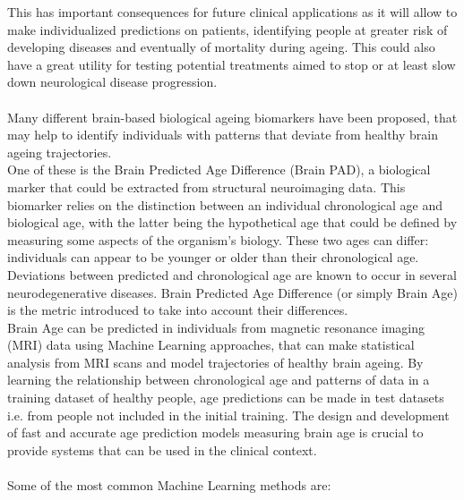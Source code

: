 \documentclass{article}
\begin{document}
	This has important consequences for future clinical applications as it will allow to make individualized predictions on patients, identifying people at greater risk of developing diseases and eventually of mortality during ageing. This could also have a great utility for testing potential treatments aimed to stop or at least slow down neurological disease progression.
	\\
	\\
	Many different brain-based biological ageing biomarkers have been proposed, that may help to identify individuals with patterns that deviate from healthy brain ageing trajectories.
	\\
	One of these is the Brain Predicted Age Difference (Brain PAD), a biological marker that could be extracted from structural neuroimaging data. This biomarker relies on the distinction between an individual chronological age and biological age, with the latter being the hypothetical age that could be defined by measuring some aspects of the organism's biology. These two ages can differ: individuals can appear to be younger or older than their chronological age. Deviations between predicted and chronological age are known to occur in several neurodegenerative diseases. Brain Predicted Age Difference (or simply Brain Age) is the metric introduced to take into account their differences.
	\\
	Brain Age can be predicted in individuals from magnetic resonance imaging (MRI) data using Machine Learning approaches, that can make statistical analysis from MRI scans and model trajectories of healthy brain ageing. By learning the relationship between chronological age and patterns of data in a training dataset of healthy people, age predictions can be made in test datasets i.e. from people not included in the initial training. The design and development of fast and accurate age prediction models measuring brain age is crucial to provide systems that can be used in the clinical context.
	\\
	\\
	Some of the most common Machine Learning methods are:
\end{document}
